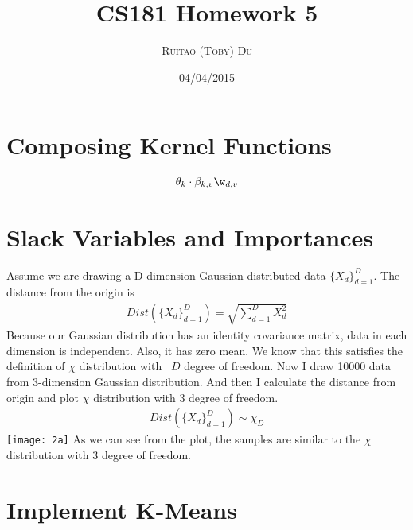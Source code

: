 \documentclass[10pt,letter]{article}
\numberwithin{equation}{section} %
\numberwithin{figure}{section} %
\numberwithin{table}{section} %
\begin{document}


\title{CS181 Homework 5}

\author{\textsc{Ruitao (Toby) Du}}
\date{04/04/2015}

 
\maketitle 


\section{Composing Kernel Functions}


\begin{align*}
	\theta_k \cdot \beta_{k,v} \w_{d,v}
\end{align*}



\newpage
\section{Slack Variables and Importances}

Assume we are drawing a D dimension Gaussian distributed data $\{X_d\}^D_{d=1}$. The distance from the origin is 
\begin{align*}
	Dist(\{X_d\}^D_{d=1}) = \sqrt{\sum^D_{d=1} X_d^2}
\end{align*}
Because our Gaussian distribution has an identity covariance
matrix, data in each dimension is independent. Also, it has zero mean. We know that this satisfies the definition of $\chi$ distribution with ~$D$ degree of freedom.
Now I draw 10000 data from 3-dimension Gaussian distribution. And then I calculate the distance from origin and plot $\chi$ distribution with 3 degree of freedom.
\begin{align*}
	Dist(\{X_d\}^D_{d=1}) \sim \chi_D
\end{align*}
\texttt{[image: 2a]}
As we can see from the plot, the samples are similar to the $\chi$ distribution with 3 degree of freedom.

\newpage
\section{Implement K-Means}
\end{document}

